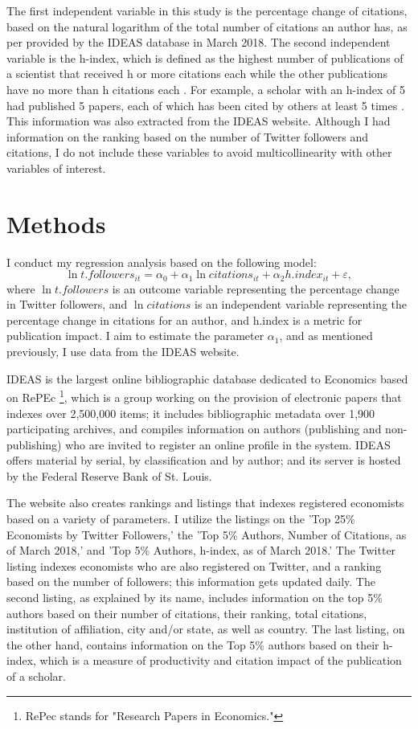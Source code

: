 \documentclass[12pt,english]{article}
\begin{document}
The first independent variable in this study is the percentage change of citations, based on the natural logarithm of the total number of citations an author has, as per provided by the IDEAS database in March 2018. The second independent variable is the h-index, which is defined as the highest number of publications of a scientist that received h or more citations each while the other publications have no more than h citations each \citep{h.index}. For example, a scholar with an h-index of 5 had published 5 papers, each of which has been cited by others at least 5 times \citep{umich}. This information was also extracted from the IDEAS website. Although I had information on the ranking based on the number of Twitter followers and citations, I do not include these variables to avoid multicollinearity with other variables of interest. 

\section{Methods}\label{sec:methods}
I conduct my regression analysis based on the following model:
\begin{equation}
\label{eq:1}
\ln{t.followers}_{it}=\alpha_{0} + \alpha_{1}\ln{citations}_{it} + \alpha_{2}h.index_{it} + \varepsilon,
\end{equation}
where $\ln{t.followers}$ is an outcome variable representing the percentage change in Twitter followers, and $\ln{citations}$ is an independent variable representing the percentage change in citations for an author, and h.index is a metric for publication impact. I aim to estimate the parameter $\alpha_{1}$, and as mentioned previously, I use data from the IDEAS website.

IDEAS is the largest online bibliographic database dedicated to Economics based on RePEc \footnote{RePec stands for "Research Papers in Economics."}, which is a group working on the provision of electronic papers that indexes over 2,500,000 items; it includes bibliographic metadata over 1,900 participating archives, and compiles information on authors (publishing and non-publishing) who are invited to register an online profile in the system\citep{ideas}. IDEAS offers material by serial, by classification and by author; and its server is hosted by the Federal Reserve Bank of St. Louis. 

The website also creates rankings and listings that indexes registered economists based on a variety of parameters. I utilize the listings on the 'Top 25\% Economists by Twitter Followers,' the 'Top 5\% Authors, Number of Citations, as of March 2018,' and 'Top 5\% Authors, h-index, as of March 2018.' The Twitter listing indexes economists who are also registered on Twitter, and a ranking based on the number of followers; this information gets updated daily. The second listing, as explained by its name, includes information on the top 5\% authors based on their number of citations, their ranking,  total citations, institution of affiliation, city and/or state, as well as country. The last listing, on the other hand, contains information on the Top 5\% authors based on their h-index, which is a measure of productivity and citation impact of the publication of a scholar. 
\end{document}
